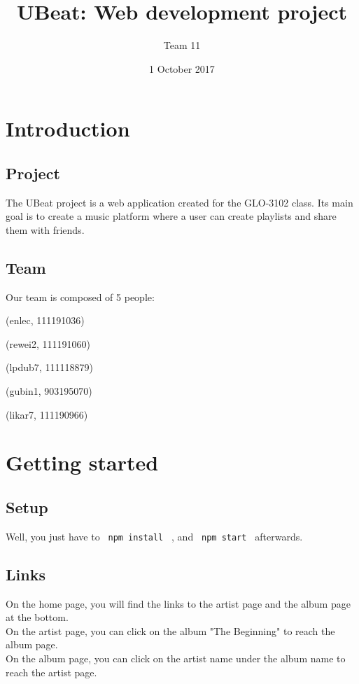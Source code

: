 \documentclass[11pt]{article}
\title{UBeat: Web development project}
\author{Team 11}
\date{1\up{st} October 2017}
\begin{document}
    \maketitle
    \newpage
    
    \section{Introduction}
    
        \subsection{Project}
        
        \noindent
        The UBeat project is a web application created for the GLO-3102 class. Its main goal is to create
        a music platform where a user can create playlists and share them with friends.
    
        \subsection{Team}
        
        \noindent
        Our team is composed of 5 people: \\

        \begin{description}[leftmargin=*]
        \item[Enora Le-Cavorzin] (enlec, 111191036)
        \item[Rémi Weislinger] (rewei2, 111191060)
        \item[Louis-Philippe Dubuc] (lpdub7, 111118879)
        \item[Guillaume Binet] (gubin1, 903195070)
        \item[Lionel Karmes] (likar7, 111190966)
        \end{description}
        
    \section{Getting started}
    
        \subsection{Setup}
    
        \noindent
        Well, you just have to \texttt{ npm install } , and \texttt{ npm start } afterwards.
        
        \subsection{Links}
        
		\noindent
		On the home page, you will find the links to the artist page and the album page at the bottom. \\
		On the artist page, you can click on the album "The Beginning" to reach the album page. \\
		On the album page, you can click on the artist name under the album name to reach the artist page.
\end{document}
